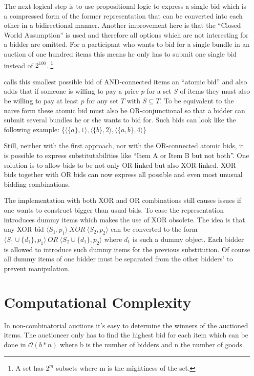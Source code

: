 \documentclass[a4paper]{paper}
\begin{document}
The next logical step is to use propositional logic to express a single bid which is a compressed form of the former representation that can be converted into each other in a bidirectional manner. Another improvement here is that the ``Closed World Assumption'' is used and therefore all options which are not interesting for a bidder are omitted. For a participant who wants to bid for a single bundle in an auction of one hundred items this means he only has to submit one single bid instead of $2^{100}$. \footnote{A set has $2^m$ subsets where m is the mightiness of the set.}

\cite{Nis00} calls this smallest possible bid of AND-connected items an ``atomic bid'' and also adds that if someone is willing to pay a price $p$ for a set $S$ of items they must also be willing to pay at least $p$ for any set $T$ with $S \subseteq T$. To be equivalent to the naive form these atomic bid must also be OR-conjunctional so that a bidder can submit several bundles he or she wants to bid for. Such bids can look like the following example: $\{ \langle \{a\}, 1 \rangle, \langle \{b\}, 2 \rangle, \langle \{a,b\},4 \rangle \}$

Still, neither with the first approach, nor with the OR-connected atomic bids, it is possible to express substitutabilities like ``Item A or Item B but not both''. One solution is to allow bids to be not only OR-linked but also XOR-linked. XOR bids together with OR bids can now express all possible and even most unusual bidding combinations.

The implementation with both XOR and OR combinations still causes issues if one wants to construct bigger than usual bids. To ease the representation \cite{FLBS99} introduces dummy items which makes the use of XOR obsolete. The idea is that any XOR bid $\langle S_1, p_1 \rangle \ XOR \ \langle S_2, p_2 \rangle $ can be converted to the form $\langle S_1 \cup \{d_1\}, p_1 \rangle \ OR \ \langle S_2 \cup \{d_1\}, p_2 \rangle $ where $d_1$ is such a dummy object. Each bidder is allowed to introduce such dummy items for the previous substitution. Of course all dummy items of one bidder must be separated from the other bidders' to prevent manipulation.

\section{Computational Complexity}

In non-combinatorial auctions it's easy to determine the winners of the auctioned items. The auctioneer only has to find the highest bid for each item which can be done in $\mathcal O(b * n)$ where b is the number of bidders and n the number of goods.
\end{document}

